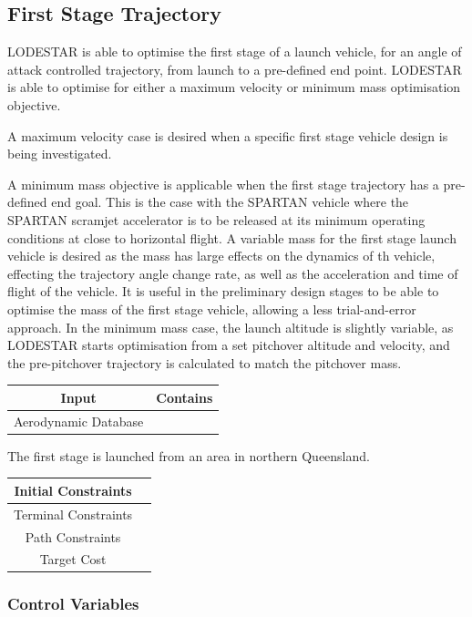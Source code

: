 \subsection{First Stage Trajectory}



LODESTAR is able to optimise the first stage of a launch vehicle, for an angle of attack controlled trajectory, from launch to a pre-defined end point. 
LODESTAR is able to optimise for either a maximum velocity or minimum mass optimisation objective. 

A maximum velocity case is desired when a specific first stage vehicle design is being investigated. 
 
A minimum mass objective is applicable when the first stage trajectory has a pre-defined end goal. This is the case with the SPARTAN vehicle where the SPARTAN scramjet accelerator is to be released at its minimum operating conditions at close to horizontal flight. 
A variable mass for the first stage launch vehicle is desired as the mass has large effects on the dynamics of th vehicle, effecting the trajectory angle change rate, as well as the acceleration and time of flight of the vehicle.
It is useful in the preliminary design stages to be able to optimise the mass of the first stage vehicle, allowing a less trial-and-error approach.
In the minimum mass case, the launch altitude is slightly variable, as LODESTAR starts optimisation from a set pitchover altitude and velocity, and the pre-pitchover trajectory is calculated to match the pitchover mass. 

\begin{tabular}{|c|c|}
	\hline Input  & Contains\\ 
	\hline Aerodynamic Database  & \\ 
	\hline 
\end{tabular} 


The first stage is launched from an area in northern Queensland.

\begin{tabular}{|c|c|}
	\hline Initial Constraints  & \\ 
	\hline Terminal Constraints &  \\ 
	\hline Path Constraints &  \\ 
	\hline Target Cost &  \\ 
	\hline 
\end{tabular} 

\subsubsection{Control Variables}

